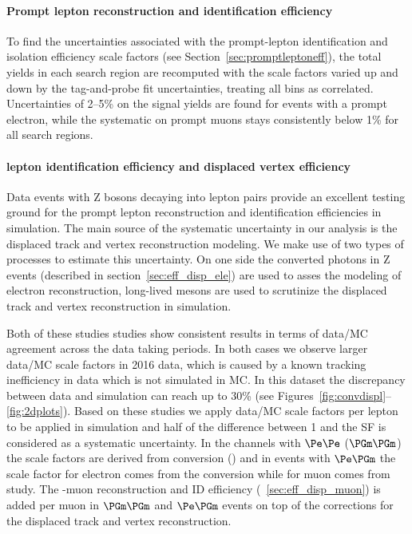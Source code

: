 \paragraph{Prompt lepton reconstruction and identification efficiency}
\label{sec:promptleptoneffsysts}
To find the uncertainties associated with the prompt-lepton
identification and isolation efficiency scale factors (see
Section~\ref{sec:promptleptoneff}),
the total yields in each search region are recomputed with the scale
factors varied up and down by the tag-and-probe fit uncertainties,
treating all bins as correlated.
Uncertainties of 2--5\% on the signal yields are found
for events with a prompt electron, while the systematic on prompt
muons stays consistently below 1\% for all search regions.

\paragraph{\Displ lepton identification efficiency and displaced vertex efficiency }
\label{sec:nonpromptleptoneffsysts}
Data events with Z bosons decaying into lepton pairs provide an excellent testing ground for the prompt lepton 
reconstruction and identification efficiencies in simulation.
The main source of the systematic uncertainty in our analysis is the displaced track and vertex reconstruction modeling. 
We make use of two types of processes to estimate this uncertainty. On one side the converted photons in Z events (described in section~\ref{sec:eff_disp_ele}) 
are used to asses the modeling of \displ electron reconstruction,  long-lived \PKzS 
mesons are used to scrutinize the displaced track and vertex reconstruction in simulation. 

Both of these studies studies show consistent results in terms of data/MC agreement across the data taking periods. 
In both cases we observe larger data/MC scale factors in 2016 data, which is caused by a known tracking inefficiency 
in data which is not simulated in MC. In this dataset the discrepancy
between data and simulation can reach up to 30\% (see
Figures~\ref{fig:convdispl}--\ref{fig:2dplots}).
Based on these studies we apply data/MC scale factors per \displ
lepton to be applied in simulation and half of the difference between
1 and the SF is considered as a systematic uncertainty.  
In the channels with \displ $\Pe\Pe$ ($\PGm\PGm$) the scale factors
are derived from conversion (\PKzS) and in events with \displ $\Pe\PGm$ the 
scale factor for electron comes from the conversion while for muon
comes from \PKzS study. The \Displ-muon reconstruction and ID
efficiency (~\ref{sec:eff_disp_muon}) is added per muon in 
$\PGm\PGm$ and $\Pe\PGm$ events on top of the corrections for the displaced
track and vertex reconstruction.


